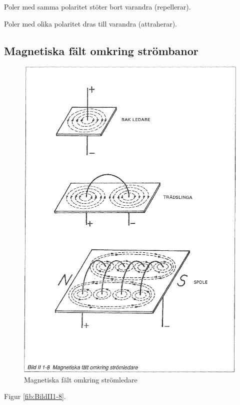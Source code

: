 Poler med samma polaritet stöter bort varandra (repellerar).

Poler med olika polaritet dras till varandra (attraherar).

\subsection{Magnetiska fält omkring strömbanor}

\begin{figure}
\begin{center}
\includegraphics[width=14cm]{images/bild_2_1-08}
\caption{Magnetiska fält omkring strömledare}
\label{fig:BildII1-8}
\end{center}
\end{figure}

Figur \ref{fib:BildII1-8}.

